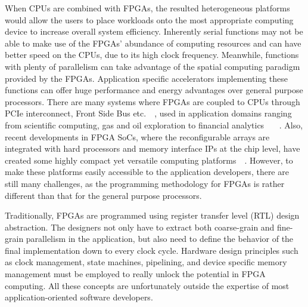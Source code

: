 When CPUs are combined with FPGAs,
the resulted heterogeneous platforms would allow the users to place workloads onto the most appropriate
computing device to increase overall system efficiency.
Inherently serial functions may not be able to make use of the FPGAs' abundance of computing resources and can have better speed on the CPUs, due to its high clock frequency.
Meanwhile, functions with plenty of parallelism can take advantage of the
spatial computing paradigm provided by the FPGAs.
Application specific accelerators implementing these functions can offer
huge performance and energy advantages over general purpose
processors. There are many systems where FPGAs are coupled to CPUs through PCIe interconnect, Front Side Bus etc.~\cite{nallatech510T}~\cite{maxeler},
used in application domains ranging from scientific computing, gas and oil exploration to financial analytics
~\cite{smith2005scientific}~\cite{5719584}~\cite{6299067}.
Also, recent developments in FPGA SoCs, where the reconfigurable arrays are  integrated with hard processors and memory interface IPs at the chip level,
have created some highly compact yet versatile computing platforms~\cite{chips:zynq}~\cite{chips:cyclonesoc}. 
However, to make these platforms easily accessible to the application developers, there are still many challenges,
as the programming methodology for FPGAs is rather different than that for the general purpose processors.

Traditionally, FPGAs are programmed using register transfer level (RTL) design
abstraction. The designers not only have to extract both coarse-grain and fine-grain parallelism in the
application, but also
need to define the behavior of the final implementation down to every clock cycle.
Hardware design principles such as clock management, state machines,
pipelining, and device specific memory management must be employed to really unlock the potential
in FPGA computing. All these concepts are unfortunately outside the expertise of most application-oriented
software developers. 

